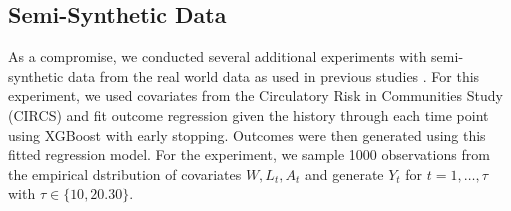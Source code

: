 \documentclass{article}
\theoremstyle{plain}
\theoremstyle{definition}
\theoremstyle{remark}
\begin{document}
\begin{table}[ht]
\centering
\caption{Results from simple synthetic data}
\label{table1}
\end{table}

\subsection{Semi-Synthetic Data}

\label{sec:semi-synth}

As a compromise, we conducted several additional experiments with semi-synthetic data from the real world data as used in previous studies \cite{Bica2020Estimating,Frauen_Hatt_Melnychuk_Feuerriegel_2023}. For this experiment, we used covariates from the Circulatory Risk in Communities Study (CIRCS) and fit outcome regression given the history through each time point using XGBoost with early stopping. Outcomes were then generated using this fitted regression model. For the experiment, we sample 1000 observations from the empirical dstribution of covariates $W,L_t,A_t$ and generate $Y_t$ for $t=1,\ldots,\tau$ with $\tau\in\{10,20.30\}$.
\end{document}
